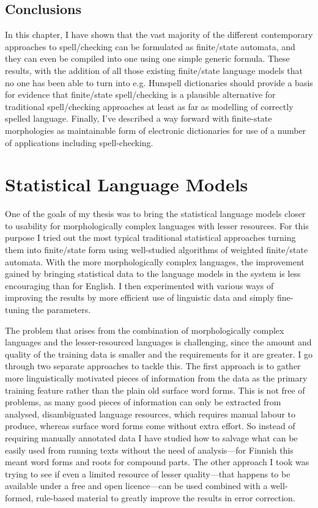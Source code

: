\documentclass[officiallayout]{unihelcompling}
\begin{document}
\section{Conclusions}

In this chapter, I have shown that the vast majority of the different
contemporary approaches to spell\-/checking can be formulated as finite\-/state
automata, and they can even be compiled into one using one simple generic
formula. These results, with the addition of all those existing finite\-/state
language models that no one has been able to turn into e.g. Hunspell
dictionaries should provide a basis for evidence that finite\-/state
spell\-/checking is a plausible alternative for traditional spell\-/checking
approaches at least as far as modelling of correctly spelled language. Finally,
I've described a way forward with finite-state morphologies as maintainable
form of electronic dictionaries for use of a number of applications including
spell-checking.

\chapter{Statistical Language Models}
\label{chap:statistical-models}

One of the goals of my thesis was to bring the statistical language models
closer to usability for morphologically complex languages with lesser
resources. For this purpose I tried out the most typical traditional
statistical approaches turning them into finite\-/state form using well-studied
algorithms of weighted finite\-/state automata. With the more morphologically
complex languages, the improvement gained by bringing statistical data to the
language models in the system is less encouraging than for English. I then
experimented with various ways of improving the results by more efficient use
of linguistic data and simply fine-tuning the parameters.

The problem that arises from the combination of morphologically complex
languages and the lesser-resourced languages is challenging, since the amount
and quality of the training data is smaller and the requirements for it are
greater. I go through two separate approaches to tackle this. The first
approach is to gather more linguistically motivated pieces of information from
the data as the primary training feature rather than the plain old surface
word forms. This is not free of problems, as many good pieces of information
can only be extracted from analysed, disambiguated language resources,
which requires manual labour to produce, whereas surface word forms
come without extra effort. So instead of requiring manually annotated data I
have studied how to salvage what can be easily used from running texts without
the need of analysis---for Finnish this meant word forms and roots for compound
parts. The other approach I took was trying to see if even a limited
resource of lesser quality---that happens to be available under a free and open
licence---can be used combined with a well-formed, rule-based material to
greatly improve the results in error correction.
\end{document}
